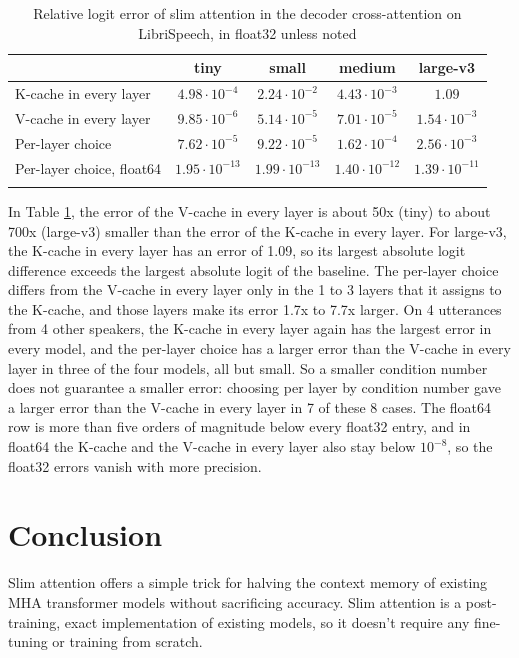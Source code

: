 \documentclass{article}
\def\fline{\Xhline{2\arrayrulewidth}}              %
\begin{document}
\begin{table}[h!] \centering
  \caption{Relative logit error of slim attention in the decoder cross-attention on LibriSpeech, in float32 unless noted}
  \begin{tabular}{lcccc} \fline
                               & tiny                 & small                & medium               & large-v3             \\ \hline
  K-cache in every layer       & $4.98 \cdot 10^{-4}$  & $2.24 \cdot 10^{-2}$  & $4.43 \cdot 10^{-3}$  & $1.09$                \\
  V-cache in every layer       & $9.85 \cdot 10^{-6}$  & $5.14 \cdot 10^{-5}$  & $7.01 \cdot 10^{-5}$  & $1.54 \cdot 10^{-3}$  \\
  Per-layer choice             & $7.62 \cdot 10^{-5}$  & $9.22 \cdot 10^{-5}$  & $1.62 \cdot 10^{-4}$  & $2.56 \cdot 10^{-3}$  \\
  Per-layer choice, float64    & $1.95 \cdot 10^{-13}$ & $1.99 \cdot 10^{-13}$ & $1.40 \cdot 10^{-12}$ & $1.39 \cdot 10^{-11}$ \\ \fline
\end{tabular} \label{tab:logits} \end{table}

In Table \ref{tab:logits}, the error of the V-cache in every layer is about 50x (tiny) to about 700x (large-v3) smaller than the error of the K-cache in every layer. For large-v3, the K-cache in every layer has an error of 1.09, so its largest absolute logit difference exceeds the largest absolute logit of the baseline. The per-layer choice differs from the V-cache in every layer only in the 1 to 3 layers that it assigns to the K-cache, and those layers make its error 1.7x to 7.7x larger. On 4 utterances from 4 other speakers, the K-cache in every layer again has the largest error in every model, and the per-layer choice has a larger error than the V-cache in every layer in three of the four models, all but small. So a smaller condition number does not guarantee a smaller error: choosing per layer by condition number gave a larger error than the V-cache in every layer in 7 of these 8 cases. The float64 row is more than five orders of magnitude below every float32 entry, and in float64 the K-cache and the V-cache in every layer also stay below $10^{-8}$, so the float32 errors vanish with more precision.

\section{Conclusion}
Slim attention offers a simple trick for halving the context memory of existing MHA transformer models without sacrificing accuracy. Slim attention is a post-training, exact implementation of existing models, so it doesn't require any fine-tuning or training from scratch.
\end{document}
